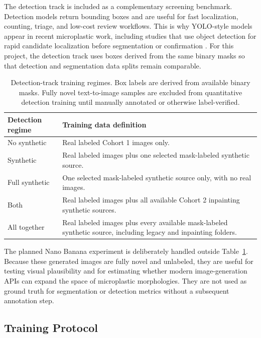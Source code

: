 \documentclass{article}
\begin{document}
The detection track is included as a complementary screening benchmark. Detection models return bounding boxes and are useful for fast localization, counting, triage, and low-cost review workflows. This is why YOLO-style models appear in recent microplastic work, including studies that use object detection for rapid candidate localization before segmentation or confirmation \cite{lorenzo2021,hao2024,zahir2025}. For this project, the detection track uses boxes derived from the same binary masks so that detection and segmentation data splits remain comparable.

\begin{table}[H]
  \centering
  \caption{Detection-track training regimes. Box labels are derived from available binary masks. Fully novel text-to-image samples are excluded from quantitative detection training until manually annotated or otherwise label-verified.}
  \label{tab:detection-track}
  \begin{tabular}{lp{}}
    \toprule
    \textbf{Detection regime} & \textbf{Training data definition} \\
    \midrule
    No synthetic & Real labeled Cohort 1 images only. \\
    Synthetic & Real labeled images plus one selected mask-labeled synthetic source. \\
    Full synthetic & One selected mask-labeled synthetic source only, with no real images. \\
    Both & Real labeled images plus all available Cohort 2 inpainting synthetic sources. \\
    All together & Real labeled images plus every available mask-labeled synthetic source, including legacy and inpainting folders. \\
    \bottomrule
  \end{tabular}
\end{table}

The planned Nano Banana experiment is deliberately handled outside Table~\ref{tab:detection-track}. Because these generated images are fully novel and unlabeled, they are useful for testing visual plausibility and for estimating whether modern image-generation APIs can expand the space of microplastic morphologies. They are not used as ground truth for segmentation or detection metrics without a subsequent annotation step.

\subsection{Training Protocol}
\end{document}
